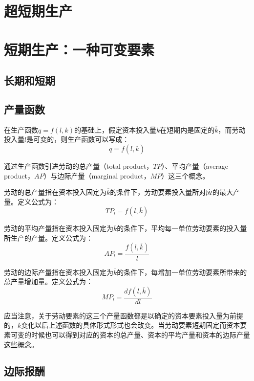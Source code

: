 \section[超短期生产]{超短期生产}

\section[短期生产]{短期生产：一种可变要素}
\subsection{长期和短期}
\subsection{产量函数}
在生产函数$q=f(l,k)$的基础上，假定资本投入量$k$在短期内是固定的$\overline k$，而劳动投入量$l$是可变的，则生产函数可以写成：
\begin{equation}
q = f(l,\overline k )
\end{equation}

通过生产函数引进劳动的总产量（total product，$TP$）、平均产量（average product，$AP$）与边际产量（marginal product，$MP$）这三个概念。

劳动的总产量指在资本投入固定为$\overline k$的条件下，劳动要素投入量所对应的最大产量。定义公式为：
\begin{equation}
TP_l = f(l, \overline k)
\end{equation}

劳动的平均产量指在资本投入固定为$\overline k$的条件下，平均每一单位劳动要素的投入量所生产的产量。定义公式为：
\begin{equation}
AP_l = \frac{f(l, \overline k)}{l}
\end{equation}

劳动的边际产量指在资本投入固定为$\overline k$的条件下，每增加一单位劳动要素所带来的总产量增加量。定义公式为：
\begin{equation}
MP_l = \frac{{d f(l, \overline k)}}{{d l}}
\end{equation}

应当注意，关于劳动要素的这三个产量函数都是以确定的资本要素投入量为前提的，$\overline k$变化以后上述函数的具体形式形式也会改变。当劳动要素短期固定而资本要素可变的时候也可以得到对应的资本的总产量、资本的平均产量和资本的边际产量这些概念。


\subsection{边际报酬}


